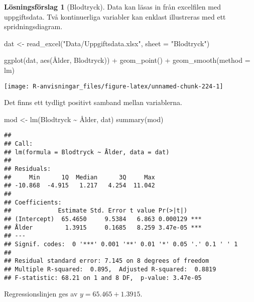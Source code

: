 \documentclass[
]{book}
\newenvironment{Shaded}{\begin{snugshade}}{\end{snugshade}}
\newcommand{\AttributeTok}[1]{\textcolor[rgb]{0.77,0.63,0.00}{#1}}
\newcommand{\FunctionTok}[1]{\textcolor[rgb]{0.00,0.00,0.00}{#1}}
\newcommand{\NormalTok}[1]{#1}
\newcommand{\OtherTok}[1]{\textcolor[rgb]{0.56,0.35,0.01}{#1}}
\newcommand{\SpecialCharTok}[1]{\textcolor[rgb]{0.00,0.00,0.00}{#1}}
\newcommand{\StringTok}[1]{\textcolor[rgb]{0.31,0.60,0.02}{#1}}
\theoremstyle{definition}
\theoremstyle{definition}
\theoremstyle{definition}
\theoremstyle{definition}
\newtheorem{hypothesis}{Lösningsförslag}[chapter]
\theoremstyle{remark}
\begin{document}
\begin{hypothesis}[Blodtryck]
Data kan läsas in från excelfilen med uppgiftsdata. Två kontinuerliga variabler kan enklast illustreras med ett spridningsdiagram.

\begin{Shaded}
\begin{Highlighting}[]
\NormalTok{dat }\OtherTok{\textless{}{-}} \FunctionTok{read\_excel}\NormalTok{(}\StringTok{"Data/Uppgiftsdata.xlsx"}\NormalTok{, }\AttributeTok{sheet =} \StringTok{"Blodtryck"}\NormalTok{)}

\FunctionTok{ggplot}\NormalTok{(dat, }\FunctionTok{aes}\NormalTok{(Ålder, Blodtryck)) }\SpecialCharTok{+}
  \FunctionTok{geom\_point}\NormalTok{() }\SpecialCharTok{+}
  \FunctionTok{geom\_smooth}\NormalTok{(}\AttributeTok{method =}\NormalTok{ lm)}
\end{Highlighting}
\end{Shaded}

\begin{center}\texttt{[image: R-anvisningar\_files/figure-latex/unnamed-chunk-224-1]} \end{center}

Det finns ett tydligt positivt samband mellan variablerna.

\begin{Shaded}
\begin{Highlighting}[]
\NormalTok{mod }\OtherTok{\textless{}{-}} \FunctionTok{lm}\NormalTok{(Blodtryck }\SpecialCharTok{\textasciitilde{}}\NormalTok{ Ålder, dat)}
\FunctionTok{summary}\NormalTok{(mod)}
\end{Highlighting}
\end{Shaded}

\begin{verbatim}
## 
## Call:
## lm(formula = Blodtryck ~ Ålder, data = dat)
## 
## Residuals:
##     Min      1Q  Median      3Q     Max 
## -10.868  -4.915   1.217   4.254  11.042 
## 
## Coefficients:
##             Estimate Std. Error t value Pr(>|t|)    
## (Intercept)  65.4650     9.5384   6.863 0.000129 ***
## Ålder         1.3915     0.1685   8.259 3.47e-05 ***
## ---
## Signif. codes:  0 '***' 0.001 '**' 0.01 '*' 0.05 '.' 0.1 ' ' 1
## 
## Residual standard error: 7.145 on 8 degrees of freedom
## Multiple R-squared:  0.895,  Adjusted R-squared:  0.8819 
## F-statistic: 68.21 on 1 and 8 DF,  p-value: 3.47e-05
\end{verbatim}

Regressionslinjen ges av \(y = 65.465 + 1.3915\).


\end{hypothesis}
\end{document}
